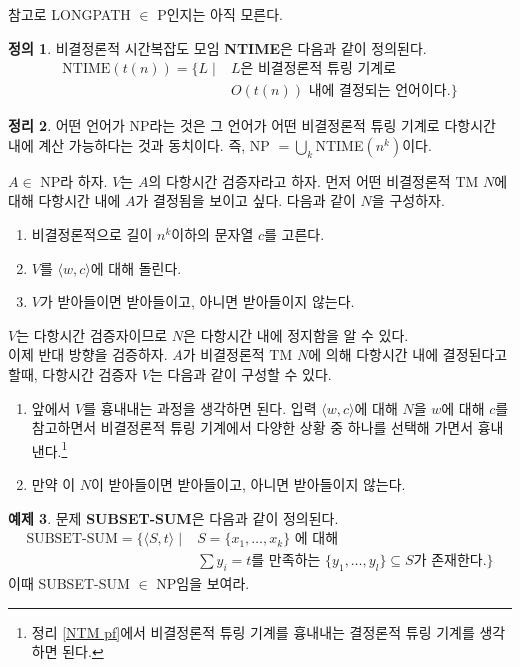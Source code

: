 \documentclass[b5paper, 11pt]{book}
\theoremstyle{definition}
\newtheorem{defn}{정의}[chapter]
\newtheorem{thm}[defn]{정리}
\newtheorem{ex}[defn]{예제}
\newenvironment{pf*}{\pushQED{\qed}\pf}
{\popQED\endpf}
\begin{document}
참고로 LONGPATH $\in $ P인지는 아직 모른다.
\begin{defn}
    비결정론적 시간복잡도 모임 \textbf{NTIME}은 다음과 같이 정의된다. 
    \begin{align*}
        \text{NTIME}(t(n)) = \{L \;\vert\; &L\text{은 비결정론적 튜링 기계로 } \\ &O(t(n)) \text{ 내에 
        결정되는 언어이다.} \}
    \end{align*}
\end{defn}
\begin{thm}
    어떤 언어가 NP라는 것은 그 언어가 어떤 비결정론적 튜링 기계로 다항시간 내에 계산 가능하다는 것과 동치이다.
    즉, NP $= \bigcup_k$NTIME$(n^k)$이다.
\end{thm}
\begin{pf*}
    $A \in $ NP라 하자. $V$는 $A$의 다항시간 검증자라고 하자. 먼저 어떤 비결정론적 TM $N$에 대해 다항시간 내에 $A$가 결정됨을 보이고 싶다. 다음과 같이 $N$을 구성하자.
    \begin{enumerate}
        \item 비결정론적으로 길이 $n^k$이하의 문자열 $c$를 고른다.
        \item $V$를 $\langle w,c \rangle$에 대해 돌린다.
        \item $V$가 받아들이면 받아들이고, 아니면 받아들이지 않는다. 
    \end{enumerate}
    $V$는 다항시간 검증자이므로 $N$은 다항시간 내에 정지함을 알 수 있다. \\ 
    이제 반대 방향을 검증하자. $A$가 비결정론적 TM $N$에 의해 다항시간 내에 결정된다고 할때, 다항시간 검증자 $V$는 다음과 같이 구성할 수 있다.
    \begin{enumerate}
        \item 앞에서 $V$를 흉내내는 과정을 생각하면 된다. 입력 $\langle w,c \rangle$에 대해 $N$을 $w$에 대해 $c$를 참고하면서 비결정론적 튜링 기계에서 다양한 상황 중 하나를 선택해 가면서 흉내낸다.\footnote{정리 \ref{NTM pf}에서 비결정론적 튜링 기계를 흉내내는 결정론적 튜링 기계를 생각하면 된다.} 
        \item 만약 이 $N$이 받아들이면 받아들이고, 아니면 받아들이지 않는다.
    \end{enumerate}
\end{pf*}
\begin{ex}
    문제 \textbf{SUBSET-SUM}은 다음과 같이 정의된다. 
    \begin{align*}
        \text{SUBSET-SUM} = \{\langle S, t \rangle \; \vert \; &S = \{x_1, \ldots , x_k\} \text{ 에 대해 }
        \\ &\sum y_i = t \text{를 만족하는 }\{y_1, \ldots, y_l \} \subseteq S  \text{가 존재한다.} \}
    \end{align*}
    이때 SUBSET-SUM $\in$ NP임을 보여라.
\end{ex}
\end{document}
